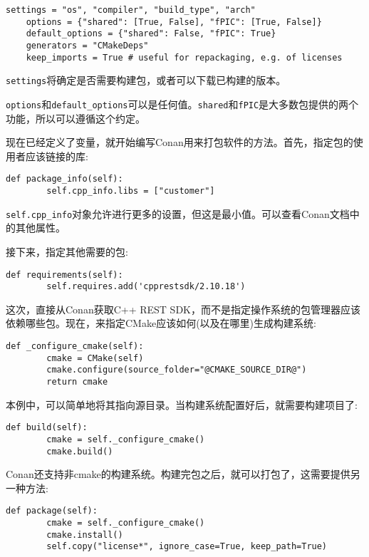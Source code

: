 \begin{lstlisting}[style=stylePython]
	settings = "os", "compiler", "build_type", "arch"
	options = {"shared": [True, False], "fPIC": [True, False]}
	default_options = {"shared": False, "fPIC": True}
	generators = "CMakeDeps"
	keep_imports = True # useful for repackaging, e.g. of licenses
\end{lstlisting}

\texttt{settings}将确定是否需要构建包，或者可以下载已构建的版本。

\texttt{options}和\texttt{default\_options}可以是任何值。\texttt{shared}和\texttt{fPIC}是大多数包提供的两个功能，所以可以遵循这个约定。

现在已经定义了变量，就开始编写Conan用来打包软件的方法。首先，指定包的使用者应该链接的库:

\begin{lstlisting}[style=stylePython]
	def package_info(self):
		self.cpp_info.libs = ["customer"]
\end{lstlisting}

\texttt{self.cpp\_info}对象允许进行更多的设置，但这是最小值。可以查看Conan文档中的其他属性。

接下来，指定其他需要的包:

\begin{lstlisting}[style=stylePython]
	def requirements(self):
		self.requires.add('cpprestsdk/2.10.18')
\end{lstlisting}

这次，直接从Conan获取C++ REST SDK，而不是指定操作系统的包管理器应该依赖哪些包。现在，来指定CMake应该如何(以及在哪里)生成构建系统:

\begin{lstlisting}[style=stylePython]
	def _configure_cmake(self):
		cmake = CMake(self)
		cmake.configure(source_folder="@CMAKE_SOURCE_DIR@")
		return cmake
\end{lstlisting}

本例中，可以简单地将其指向源目录。当构建系统配置好后，就需要构建项目了:

\begin{lstlisting}[style=stylePython]
	def build(self):
		cmake = self._configure_cmake()
		cmake.build()
\end{lstlisting}

Conan还支持非cmake的构建系统。构建完包之后，就可以打包了，这需要提供另一种方法:

\begin{lstlisting}[style=stylePython]
	def package(self):
		cmake = self._configure_cmake()
		cmake.install()
		self.copy("license*", ignore_case=True, keep_path=True)
\end{lstlisting}

